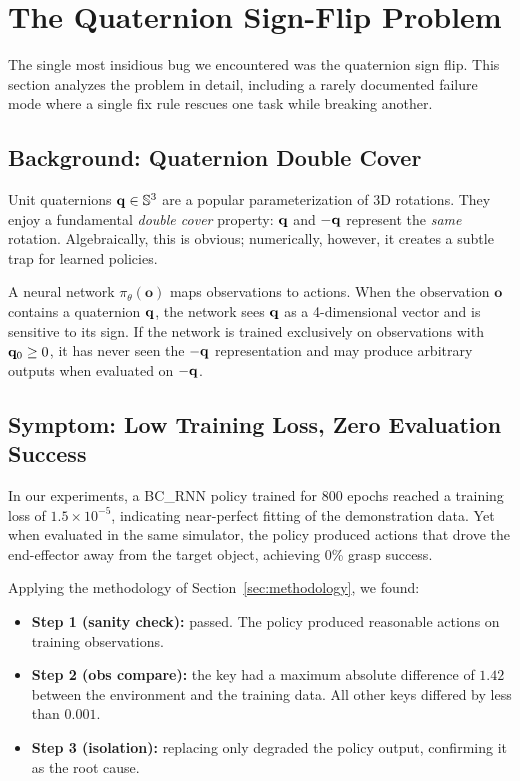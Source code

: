 \section{The Quaternion Sign-Flip Problem}
\label{sec:quaternion}

The single most insidious bug we encountered was the quaternion sign flip. This section analyzes the problem in detail, including a rarely documented failure mode where a single fix rule rescues one task while breaking another.

\subsection{Background: Quaternion Double Cover}
\label{sec:quaternion:background}

Unit quaternions $\mathbf{q} \in \mathbb{S}^3$ are a popular parameterization of 3D rotations. They enjoy a fundamental \emph{double cover} property: $\mathbf{q}$ and $-\mathbf{q}$ represent the \emph{same} rotation. Algebraically, this is obvious; numerically, however, it creates a subtle trap for learned policies.

A neural network $\pi_\theta(\mathbf{o})$ maps observations to actions. When the observation $\mathbf{o}$ contains a quaternion $\mathbf{q}$, the network sees $\mathbf{q}$ as a 4-dimensional vector and is sensitive to its sign. If the network is trained exclusively on observations with $\mathbf{q}_0 \geq 0$, it has never seen the $-\mathbf{q}$ representation and may produce arbitrary outputs when evaluated on $-\mathbf{q}$.

\subsection{Symptom: Low Training Loss, Zero Evaluation Success}
\label{sec:quaternion:symptom}

In our experiments, a BC\_RNN policy trained for 800 epochs reached a training loss of $1.5 \times 10^{-5}$, indicating near-perfect fitting of the demonstration data. Yet when evaluated in the same simulator, the policy produced actions that drove the end-effector away from the target object, achieving 0\% grasp success.

Applying the methodology of Section~\ref{sec:methodology}, we found:
\begin{itemize}[leftmargin=*,itemsep=2pt]
    \item \textbf{Step 1 (sanity check):} passed. The policy produced reasonable actions on training observations.
    \item \textbf{Step 2 (obs compare):} the key  had a maximum absolute difference of $1.42$ between the environment and the training data. All other keys differed by less than $0.001$.
    \item \textbf{Step 3 (isolation):} replacing only  degraded the policy output, confirming it as the root cause.
\end{itemize}

